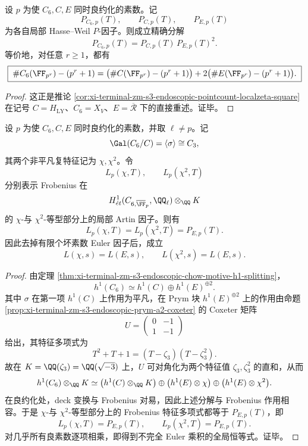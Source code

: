 \begin{theorem}\label{thm:xi-leyang-local-factor-square-decomposition}
设 \(p\) 为使 \(C_6,C,E\) 同时良约化的素数。记
\[
P_{C_6,p}(T),\qquad P_{C,p}(T),\qquad P_{E,p}(T)
\]
为各自局部 Hasse--Weil \(P\)-因子。则成立精确分解
\[
\boxed{\;
P_{C_6,p}(T)=P_{C,p}(T)\,P_{E,p}(T)^2.\;}
\]
等价地，对任意 \(r\ge 1\)，都有
\[
\boxed{\;
\#C_6(\FF_{p^r})-(p^r+1)
=
\bigl(\#C(\FF_{p^r})-(p^r+1)\bigr)
+2\bigl(\#E(\FF_{p^r})-(p^r+1)\bigr).\;}
\]
\end{theorem}
\begin{proof}
这正是推论 \ref{cor:xi-terminal-zm-s3-endoscopic-pointcount-localzeta-square} 在记号 \(C=H_{\mathrm{LY}}\)、\(C_6=X_V\)、\(E=\overline{\mathcal R}\) 下的直接重述。证毕。
\end{proof}

\begin{theorem}\label{thm:xi-leyang-c3-artin-factor-equals-elliptic}
设 \(p\) 为使 \(C_6,C,E\) 同时良约化的素数，并取 \(\ell\neq p\)。记
\[
\Gal(C_6/C)=\langle\sigma\rangle\cong C_3,
\]
其两个非平凡复特征记为 \(\chi,\chi^2\)。令
\[
L_p(\chi,T),\qquad L_p(\chi^2,T)
\]
分别表示 Frobenius 在
\[
H^1_{\acute et}(C_{6,\overline{\FF}_p},\QQ_\ell)\otimes_{\QQ}K
\]
的 \(\chi\)-与 \(\chi^2\)-等型部分上的局部 Artin 因子。则有
\[
\boxed{\;
L_p(\chi,T)=L_p(\chi^2,T)=P_{E,p}(T).\;}
\]
因此去掉有限个坏素数 Euler 因子后，成立
\[
\boxed{\;
L(\chi,s)=L(E,s),
\qquad
L(\chi^2,s)=L(E,s).\;}
\]
\end{theorem}
\begin{proof}
由定理 \ref{thm:xi-terminal-zm-s3-endoscopic-chow-motive-h1-splitting}，
\[
h^1(C_6)\simeq h^1(C)\oplus h^1(E)^{\oplus 2}.
\]
其中 \(\sigma\) 在第一项 \(h^1(C)\) 上作用为平凡，在 Prym 块 \(h^1(E)^{\oplus 2}\) 上的作用由命题 \ref{prop:xi-terminal-zm-s3-endoscopic-prym-a2-coxeter} 的 Coxeter 矩阵
\[
U=
\begin{pmatrix}
0 & -1\\
1 & -1
\end{pmatrix}
\]
给出，其特征多项式为
\[
T^2+T+1=(T-\zeta_3)(T-\zeta_3^2).
\]
故在 \(K=\QQ(\zeta_3)=\QQ(\sqrt{-3})\) 上，\(U\) 可对角化为两个特征值 \(\zeta_3,\zeta_3^2\) 的直和，从而
\[
h^1(C_6)\otimes_{\QQ}K
\simeq
\bigl(h^1(C)\otimes_{\QQ}K\bigr)\oplus
\bigl(h^1(E)\otimes\chi\bigr)\oplus
\bigl(h^1(E)\otimes\chi^2\bigr).
\]
在良约化处，deck 变换与 Frobenius 对易，因此上述分解与 Frobenius 作用相容。于是 \(\chi\)-与 \(\chi^2\)-等型部分上的 Frobenius 特征多项式都等于 \(P_{E,p}(T)\)，即
\[
L_p(\chi,T)=P_{E,p}(T),
\qquad
L_p(\chi^2,T)=P_{E,p}(T).
\]
对几乎所有良素数逐项相乘，即得到不完全 Euler 乘积的全局恒等式。证毕。
\end{proof}

